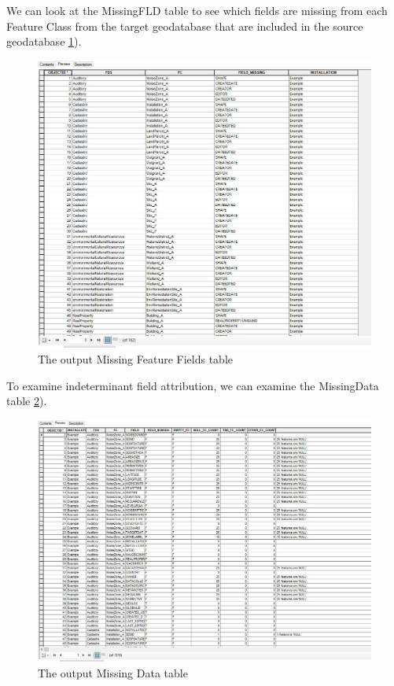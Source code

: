 \documentclass[openany]{book}
\theoremstyle{definition}
\theoremstyle{definition}
\theoremstyle{definition}
\theoremstyle{remark}
\begin{document}
We can look at the MissingFLD table to see which fields are missing from
each Feature Class from the target geodatabase that are included in the
source geodatabase \ref{fig:indtSearchmissingFLDs}).

\begin{figure}[H]

{\centering \includegraphics{figures/indtSearch-missingFLDs} 

}

\caption{The output Missing Feature Fields table}\label{fig:indtSearchmissingFLDs}
\end{figure}

To examine indeterminant field attribution, we can examine the
MissingData table \ref{fig:indtSearchmissingData}).

\begin{figure}[H]

{\centering \includegraphics{figures/indtSearch-missingData} 

}

\caption{The output Missing Data table}\label{fig:indtSearchmissingData}
\end{figure}
\end{document}
